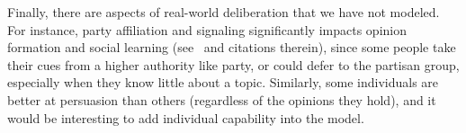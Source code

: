 Finally, there are aspects of real-world deliberation that we have not modeled. For instance, party affiliation and signaling significantly impacts opinion formation and social learning (see~\cite{partisan1} and citations therein), since some people take their cues from a higher authority like party, or could defer to the partisan group, especially when they know little about a topic. %
Similarly, some individuals are better at persuasion than others (regardless of the opinions they hold), and it would be interesting to add  individual capability into the model.

